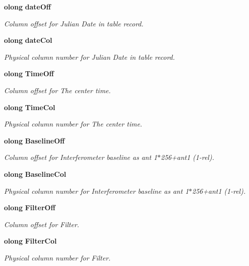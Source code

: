 \begin{CompactItemize}
{\bf olong} {\bf date\-Off}
\begin{CompactList}\small\item\em Column offset for Julian Date in table record. \item\end{CompactList}\item 
{\bf olong} {\bf date\-Col}
\begin{CompactList}\small\item\em Physical column number for Julian Date in table record. \item\end{CompactList}\item 
{\bf olong} {\bf Time\-Off}
\begin{CompactList}\small\item\em Column offset for The center time. \item\end{CompactList}\item 
{\bf olong} {\bf Time\-Col}
\begin{CompactList}\small\item\em Physical column number for The center time. \item\end{CompactList}\item 
{\bf olong} {\bf Baseline\-Off}
\begin{CompactList}\small\item\em Column offset for Interferometer baseline as ant 1$\ast$256+ant1 (1-rel). \item\end{CompactList}\item 
{\bf olong} {\bf Baseline\-Col}
\begin{CompactList}\small\item\em Physical column number for Interferometer baseline as ant 1$\ast$256+ant1 (1-rel). \item\end{CompactList}\item 
{\bf olong} {\bf Filter\-Off}
\begin{CompactList}\small\item\em Column offset for Filter. \item\end{CompactList}\item 
{\bf olong} {\bf Filter\-Col}
\begin{CompactList}\small\item\em Physical column number for Filter. \item\end{CompactList}\item 

\end{CompactItemize}
